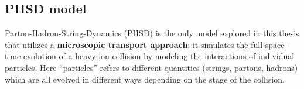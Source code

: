 \subsection{PHSD model}

Parton-Hadron-String-Dynamics (PHSD) is the only model explored in this thesis that utilizes a \textbf{microscopic transport approach}: it simulates the full space-time evolution of a heavy-ion collision by modeling the interactions of individual particles. Here ``particles'' refers to different quantities (strings, partons, hadrons) which are all evolved in different ways depending on the stage of the collision.